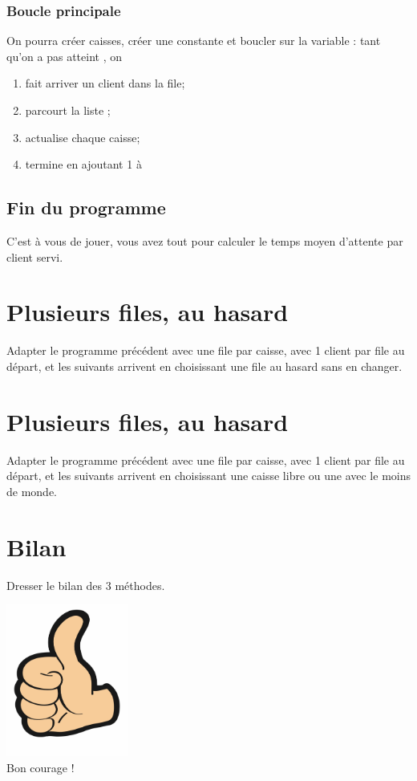 \documentclass[a4paper,12pt,french]{book}
\begin{document}
\begin{enumerate}[--]
\subsubsection*{Boucle principale}
On pourra créer  caisses, créer une constante  et boucler sur la variable : tant qu'on a pas atteint  , on
\begin{enumerate}[--]
    \item fait arriver un client dans la file;
	\item parcourt la liste ;
    \item actualise chaque caisse;
    \item termine en ajoutant 1 à 
\end{enumerate}
\subsection*{Fin du programme}
C'est à vous de jouer, vous avez tout pour calculer le temps moyen d'attente par client servi.
\end{enumerate}
\section*{Plusieurs files, au hasard}
Adapter le programme précédent avec une file par caisse, avec 1 client par file au départ, et les suivants arrivent en choisissant une file au hasard sans en changer.

\section*{Plusieurs files, au hasard}
Adapter le programme précédent avec une file par caisse, avec 1 client par file au départ, et les suivants arrivent en choisissant une caisse libre ou une avec le moins de monde.

\section*{Bilan}
Dresser le bilan des 3 méthodes.\\[3em]

\begin{center}
\includegraphics[width=4cm]{img/thumbup}\LARGE\\
Bon courage !
\end{center}
\end{document}
